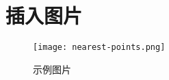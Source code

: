 \section{插入图片}

\begin{figure}[htbp]
\centering
\texttt{[image: nearest-points.png]}
\caption{示例图片}
\end{figure}
